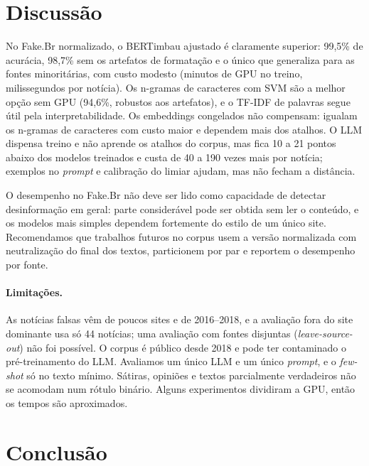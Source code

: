 \section{Discussão}

No Fake.Br normalizado, o BERTimbau ajustado é claramente superior: 99,5\% de acurácia, 98,7\% sem os artefatos de formatação e o único que generaliza para as fontes minoritárias, com custo modesto (minutos de GPU no treino, milissegundos por notícia). Os n-gramas de caracteres com SVM são a melhor opção sem GPU (94,6\%, robustos aos artefatos), e o TF-IDF de palavras segue útil pela interpretabilidade. Os embeddings congelados não compensam: igualam os n-gramas de caracteres com custo maior e dependem mais dos atalhos. O LLM dispensa treino e não aprende os atalhos do corpus, mas fica 10 a 21 pontos abaixo dos modelos treinados e custa de 40 a 190 vezes mais por notícia; exemplos no \emph{prompt} e calibração do limiar ajudam, mas não fecham a distância.

O desempenho no Fake.Br não deve ser lido como capacidade de detectar desinformação em geral: parte considerável pode ser obtida sem ler o conteúdo, e os modelos mais simples dependem fortemente do estilo de um único site. Recomendamos que trabalhos futuros no corpus usem a versão normalizada com neutralização do final dos textos, particionem por par e reportem o desempenho por fonte.

\paragraph{Limitações.} As notícias falsas vêm de poucos sites e de 2016--2018, e a avaliação fora do site dominante usa só 44 notícias; uma avaliação com fontes disjuntas (\emph{leave-source-out}) não foi possível. O corpus é público desde 2018 e pode ter contaminado o pré-treinamento do LLM. Avaliamos um único LLM e um único \emph{prompt}, e o \emph{few-shot} só no texto mínimo. Sátiras, opiniões e textos parcialmente verdadeiros não se acomodam num rótulo binário. Alguns experimentos dividiram a GPU, então os tempos são aproximados.

\section{Conclusão}

